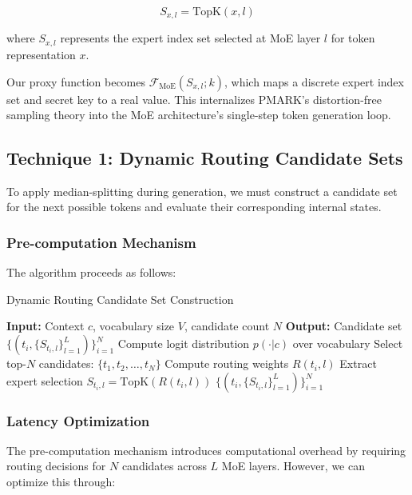 \documentclass[letterpaper,twocolumn,10pt]{article}
\begin{document}
\begin{equation}
S_{x,l} = \text{TopK}(x, l)
\end{equation}

where $S_{x,l}$ represents the expert index set selected at MoE layer $l$ for token representation $x$.

Our proxy function becomes $\mathcal{F}_{\text{MoE}}(S_{x,l}; k)$, which maps a discrete expert index set and secret key to a real value. This internalizes PMARK's distortion-free sampling theory into the MoE architecture's single-step token generation loop.

\subsection{Technique 1: Dynamic Routing Candidate Sets}

To apply median-splitting during generation, we must construct a candidate set for the next possible tokens and evaluate their corresponding internal states.

\subsubsection{Pre-computation Mechanism}

The algorithm proceeds as follows:

\begin{algorithm}
\caption{Dynamic Routing Candidate Set Construction}
\begin{algorithmic}[1]
\STATE \textbf{Input:} Context $c$, vocabulary size $V$, candidate count $N$
\STATE \textbf{Output:} Candidate set $\{(t_i, \{S_{t_i,l}\}_{l=1}^L)\}_{i=1}^N$
\STATE Compute logit distribution $p(\cdot|c)$ over vocabulary
\STATE Select top-$N$ candidates: $\{t_1, t_2, \ldots, t_N\}$
        \STATE Compute routing weights $R(t_i, l)$
        \STATE Extract expert selection $S_{t_i,l} = \text{TopK}(R(t_i, l))$
    \ENDFOR
\ENDFOR
\RETURN $\{(t_i, \{S_{t_i,l}\}_{l=1}^L)\}_{i=1}^N$
\end{algorithmic}
\end{algorithm}

\subsubsection{Latency Optimization}

The pre-computation mechanism introduces computational overhead by requiring routing decisions for $N$ candidates across $L$ MoE layers. However, we can optimize this through:
\end{document}
